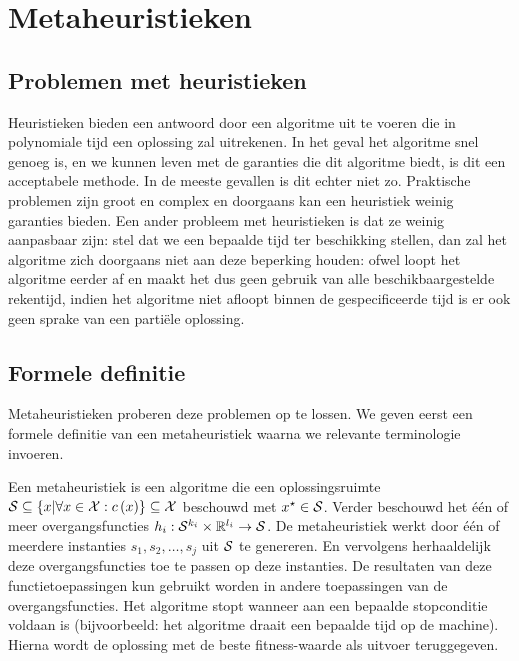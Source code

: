 \section{Metaheuristieken}

\subsection{Problemen met heuristieken}

Heuristieken bieden een antwoord door een algoritme uit te voeren die in polynomiale tijd een oplossing zal uitrekenen. In het geval het algoritme snel genoeg is, en we kunnen leven met de garanties die dit algoritme biedt, is dit een acceptabele methode. In de meeste gevallen is dit echter niet zo. Praktische problemen zijn groot en complex en doorgaans kan een heuristiek weinig garanties bieden. Een ander probleem met heuristieken is dat ze weinig aanpasbaar zijn: stel dat we een bepaalde tijd ter beschikking stellen, dan zal het algoritme zich doorgaans niet aan deze beperking houden: ofwel loopt het algoritme eerder af en maakt het dus geen gebruik van alle beschikbaargestelde rekentijd, indien het algoritme niet afloopt binnen de gespecificeerde tijd is er ook geen sprake van een parti\"ele oplossing.

\subsection{Formele definitie}

Metaheuristieken proberen deze problemen op te lossen. We geven eerst een formele definitie van een metaheuristiek waarna we relevante terminologie invoeren.

\begin{definition}[Metaheuristiek]
Een metaheuristiek is een algoritme die een oplossingsruimte $\mathcal{S}\subseteq\left\{ x|\forall x\in \mathcal{X}:c\left(x\right)\right\}\subseteq\mathcal{X}$ beschouwd met $x^{\star}\in\mathcal{S}$. Verder beschouwd het \'e\'en of meer overgangsfuncties $h_i:\mathcal{S}^{k_i}\times\mathbb{R}^{l_i}\rightarrow\mathcal{S}$. De metaheuristiek werkt door \'e\'en of meerdere instanties $s_1,s_2,\ldots,s_j$ uit $\mathcal{S}$ te genereren. En vervolgens herhaaldelijk deze overgangsfuncties toe te passen op deze instanties. De resultaten van deze functietoepassingen kun gebruikt worden in andere toepassingen van de overgangsfuncties. Het algoritme stopt wanneer aan een bepaalde stopconditie voldaan is (bijvoorbeeld: het algoritme draait een bepaalde tijd op de machine). Hierna wordt de oplossing met de beste fitness-waarde als uitvoer teruggegeven.
\end{definition}

